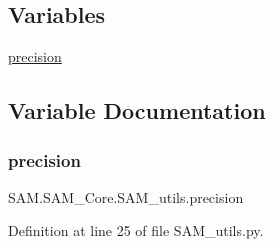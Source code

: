 \subsection*{Variables}
\begin{DoxyCompactItemize}
\item 
\hyperlink{namespaceSAM_1_1SAM__Core_1_1SAM__utils_a908d91fede0d299860184c887e66c28c}{precision}
\end{DoxyCompactItemize}


\subsection{Variable Documentation}
\mbox{\label{namespaceSAM_1_1SAM__Core_1_1SAM__utils_a908d91fede0d299860184c887e66c28c}} 
\subsubsection{\texorpdfstring{precision}{precision}}
{\footnotesize\ttfamily S\+A\+M.\+S\+A\+M\+\_\+\+Core.\+S\+A\+M\+\_\+utils.\+precision}



Definition at line 25 of file S\+A\+M\+\_\+utils.\+py.


